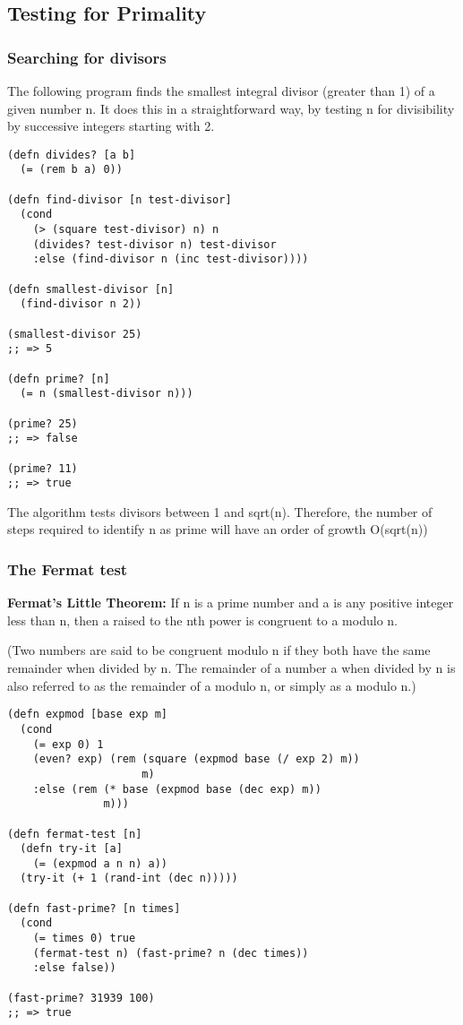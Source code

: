 \documentclass[11pt]{article}
\begin{document}
\subsection{Testing for Primality}
\label{sec-2-6}

\subsubsection{Searching for divisors}
\label{sec-2-6-1}
The following program finds the smallest integral divisor (greater than 1) of a given number n. It does this in a straightforward way, by testing n for divisibility by successive integers starting with 2.

\begin{verbatim}
(defn divides? [a b]
  (= (rem b a) 0))

(defn find-divisor [n test-divisor]
  (cond
    (> (square test-divisor) n) n
    (divides? test-divisor n) test-divisor
    :else (find-divisor n (inc test-divisor))))

(defn smallest-divisor [n]
  (find-divisor n 2))

(smallest-divisor 25)
;; => 5

(defn prime? [n]
  (= n (smallest-divisor n)))

(prime? 25)
;; => false

(prime? 11)
;; => true
\end{verbatim}

The algorithm tests divisors between 1 and sqrt(n). Therefore, the number of steps required to identify n as prime will have an order of growth O(sqrt(n))

\subsubsection{The Fermat test}
\label{sec-2-6-2}
\textbf{Fermat's Little Theorem:} If n is a prime number and a is any positive integer less than n, then a raised to the nth power is congruent to a modulo n.

(Two numbers are said to be congruent modulo n if they both have the same remainder when divided by n. The remainder of a number a when divided by n is also referred to as the remainder of a modulo n, or simply as a modulo n.)

\begin{verbatim}
(defn expmod [base exp m]
  (cond
    (= exp 0) 1
    (even? exp) (rem (square (expmod base (/ exp 2) m))
                     m)
    :else (rem (* base (expmod base (dec exp) m))
               m)))

(defn fermat-test [n]
  (defn try-it [a]
    (= (expmod a n n) a))
  (try-it (+ 1 (rand-int (dec n)))))

(defn fast-prime? [n times]
  (cond
    (= times 0) true
    (fermat-test n) (fast-prime? n (dec times))
    :else false))

(fast-prime? 31939 100)
;; => true
\end{verbatim}
\end{document}
